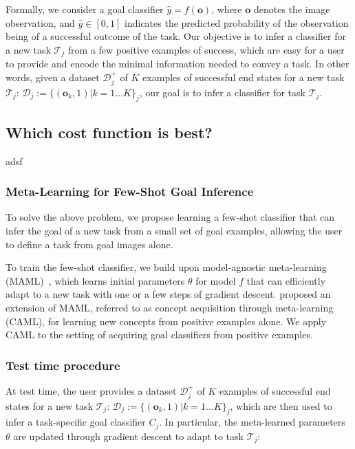 \newcommand{\task}{\mathcal{T}}
\newcommand{\data}{\mathcal{D}}
\newcommand{\obs}{\mathbf{o}}
\newcommand{\out}{y}
\newcommand{\posdata}{\data^+}
\newcommand{\testdata}{\data^\text{test}}
\newcommand{\loss}{\mathcal{L}}

Formally, we consider a goal classifier $\hat{\out} = f(\obs)$, where $\obs$ denotes the image observation, and $\hat{\out} \in [0,1]$ indicates the predicted probability of the observation being of a successful outcome of the task. Our objective is to infer a classifier for a new task $\task_j$ from a few positive examples of success, which are easy for a user to provide and encode the minimal information needed to convey a task. In other words, given a dataset $\posdata_j$ of $K$ examples of successful end states for a new task $\task_j$: $\data_j:=\{(\obs_k, 1) | k = 1...K\}_j$, our goal is to infer a classifier for task $\task_j$.

\subsection{Which cost function is best?}
adsf


\subsubsection{Meta-Learning for Few-Shot Goal Inference}

To solve the above problem, we propose learning a few-shot classifier that can infer the goal of a new task from a small set of goal examples, allowing the user to define a task from goal images alone.

To train the few-shot classifier, we build upon model-agnostic meta-learning (MAML)~\cite{maml}, which learns initial parameters $\theta$ for model $f$ that can efficiently adapt to a new task with one or a few steps of gradient descent. \cite{caml} proposed an extension of MAML, referred to as concept acquisition through meta-learning (CAML), for learning new concepts from positive examples alone. We apply CAML to the setting of acquiring goal classifiers from positive examples.

\subsubsection{Test time procedure}
At test time, the user provides a dataset $\posdata_j$ of $K$ examples of successful end states for a new task $\task_j$: $\data_j:=\{(\obs_k, 1) | k = 1...K\}_j$, which are then used to infer a task-specific goal classifier $C_j$. In particular, the meta-learned parameters $\theta$ are updated through gradient descent to adapt to task $\task_j$:

